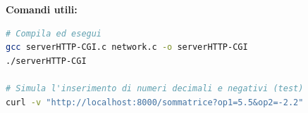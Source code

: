 \documentclass[11pt]{article}
\begin{document}
\begin{tcolorbox}[colback=green!5!white,colframe=green!75!black,title=\textbf{RISPOSTA}, breakable]
\textbf{Comandi utili:}
\begin{lstlisting}[language=bash, basicstyle=\ttfamily\small]
# Compila ed esegui
gcc serverHTTP-CGI.c network.c -o serverHTTP-CGI
./serverHTTP-CGI

# Simula l'inserimento di numeri decimali e negativi (test)
curl -v "http://localhost:8000/sommatrice?op1=5.5&op2=-2.2"
\end{lstlisting}
\end{tcolorbox}
\end{document}
